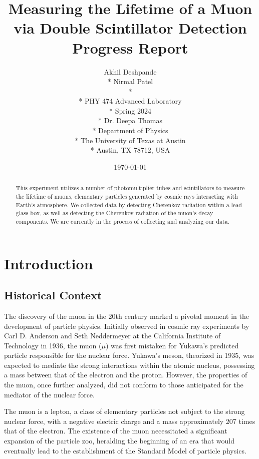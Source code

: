 \documentclass[10pt,letterpaper,onecolumn]{article}
\begin{document}

\title{Measuring the Lifetime of a Muon via Double Scintillator Detection\\
\large{Progress Report}}

\author{
 Akhil Deshpande \\*
 Nirmal Patel \\*
 \\*
 PHY 474 Advanced Laboratory \\*
 Spring 2024 \\*
 Dr. Deepa Thomas \\*
 Department of Physics \\*
 The University of Texas at Austin \\*
 Austin, TX 78712, USA
}
\date{\today}
\maketitle
\begin{abstract}
    This experiment utilizes a number of photomultiplier tubes and scintillators to measure the lifetime of muons, elementary particles generated by cosmic rays interacting with Earth's atmosphere. We collected data by detecting Cherenkov radiation within a lead glass box, as well as detecting the Cherenkov radiation of the muon's decay components. We are currently in the process of collecting and analyzing our data.
\end{abstract}
\section{Introduction}
\subsection{Historical Context}
The discovery of the muon in the 20th century marked a pivotal moment in the development of particle physics. Initially observed in cosmic ray experiments by Carl D. Anderson and Seth Neddermeyer at the California Institute of Technology in 1936, \cite{StreetStevenson:1937} the muon ($\mu$) was first mistaken for Yukawa's predicted particle responsible for the nuclear force. Yukawa's meson, theorized in 1935, was expected to mediate the strong interactions within the atomic nucleus, possessing a mass between that of the electron and the proton. However, the properties of the muon, once further analyzed, did not conform to those anticipated for the mediator of the nuclear force. \cite{Yukawa1935}


The muon is a lepton, a class of elementary particles not subject to the strong nuclear force, with a negative electric charge and a mass approximately 207 times that of the electron. \cite{CODATA2018MuonElectronMassRatio} The existence of the muon necessitated a significant expansion of the particle zoo, heralding the beginning of an era that would eventually lead to the establishment of the Standard Model of particle physics.
\end{document}
